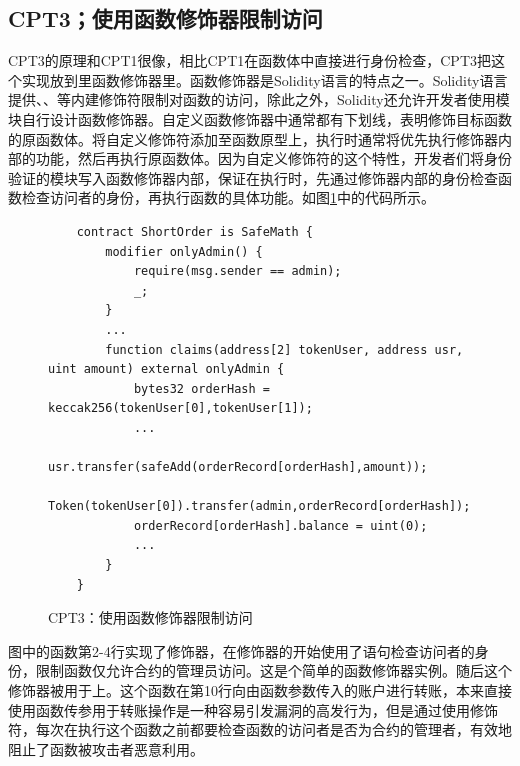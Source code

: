 \subsection{CPT3；使用函数修饰器限制访问}\label{sec:ss3}
CPT3的原理和CPT1很像，相比CPT1在函数体中直接进行身份检查，CPT3把这个实现放到里函数修饰器里。函数修饰器是Solidity语言的特点之一。Solidity语言提供、、等内建修饰符限制对函数的访问，除此之外，Solidity还允许开发者使用模块自行设计函数修饰器。自定义函数修饰器中通常都有下划线\codeff{\_;}，表明修饰目标函数的原函数体。将自定义修饰符添加至函数原型上，执行时通常将优先执行修饰器内部的功能，然后再执行原函数体。因为自定义修饰符的这个特性，开发者们将身份验证的模块写入函数修饰器内部，保证在执行时，先通过修饰器内部的身份检查函数检查访问者的身份，再执行函数的具体功能。如图\ref{fig:ss3_example}中的代码所示。
\begin{figure}
\begin{minipage}[htbp]{1.0\linewidth}
    \begin{lstlisting}
    contract ShortOrder is SafeMath {
        modifier onlyAdmin() {
            require(msg.sender == admin);
            _;
        }
        ...
        function claims(address[2] tokenUser, address usr, uint amount) external onlyAdmin {
            bytes32 orderHash = keccak256(tokenUser[0],tokenUser[1]);
            ...
            usr.transfer(safeAdd(orderRecord[orderHash],amount));
            Token(tokenUser[0]).transfer(admin,orderRecord[orderHash]);
            orderRecord[orderHash].balance = uint(0);
            ...
        }
    }
\end{lstlisting}
\end{minipage}
\vspace{-5mm}
\caption{CPT3：使用函数修饰器限制访问}
\label{fig:ss3_example}
\end{figure}
图中的函数第2-4行实现了修饰器，在修饰器的开始使用了语句检查访问者的身份，限制函数仅允许合约的管理员访问。这是个简单的函数修饰器实例。随后这个修饰器被用于上。这个函数在第10行向由函数参数传入的账户进行转账，本来直接使用函数传参用于转账操作是一种容易引发漏洞的高发行为，但是通过使用修饰符，每次在执行这个函数之前都要检查函数的访问者是否为合约的管理者，有效地阻止了函数被攻击者恶意利用。

